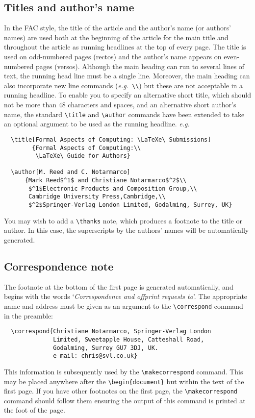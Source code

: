 \documentclass{fac}
\newcommand\eg{\textit{e.g.\ }}
\begin{document}
\subsection{Titles and author's name}

In the FAC style, the title of the article and the author's name (or
authors' names) are used both at the beginning of the article for the main
title and throughout the article as running headlines at the top of every
page.
The title is used on odd-numbered pages (rectos) and the author's name
appears on even-numbered pages (versos).
Although the main heading can run to several lines of text, the running
head line must be a single line.
Moreover, the main heading can also incorporate new line commands
(\eg \verb"\\") but these are not acceptable in a running headline.
To enable you to specify an alternative short title, which should not be
more than 48 characters and spaces, and an alternative short author's name,
the standard \verb"\title" and \verb"\author" commands have been extended
to take an optional argument to be used as the running headline. \eg
%
\begin{verbatim}
  \title[Formal Aspects of Computing: \LaTeXe\ Submissions]
        {Formal Aspects of Computing:\\
         \LaTeXe\ Guide for Authors}

  \author[M. Reed and C. Notarmarco]
      {Mark Reed$^1$ and Christiane Notarmarco$^2$\\
       $^1$Electronic Products and Composition Group,\\
       Cambridge University Press,Cambridge,\\
       $^2$Springer-Verlag London Limited, Godalming, Surrey, UK}
\end{verbatim}

You may wish to add a \verb"\thanks" note, which produces a footnote to the
title or author. In this case, the superscripts by the authors' names
will be automatically generated.

\subsection{Correspondence note}

The footnote at the bottom of the first page is generated automatically,
and begins with the words `\emph{Correspondence and offprint
requests to}'.
The appropriate name and address must be given as an argument to the
\verb"\correspond" command in the preamble:
%
\begin{verbatim}
  \correspond{Christiane Notarmarco, Springer-Verlag London
              Limited, Sweetapple House, Catteshall Road,
              Godalming, Surrey GU7 3DJ, UK.
              e-mail: chris@svl.co.uk}
\end{verbatim}
%
This information is subsequently used by the \verb"\makecorrespond" command.
This may be placed anywhere after the \verb"\begin{document}" but within the
text of the first page. If you have other footnotes on the first page, the
\verb"\makecorrespond" command should follow them ensuring the output of this
command is printed at the foot of the page.
\end{document}
